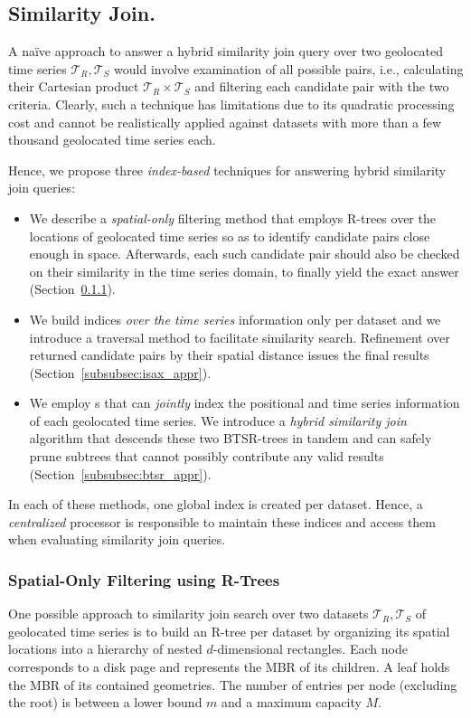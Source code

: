 \subsection{Similarity Join.} 
\label{subsec:sim_join}
A na\"ive approach to answer a hybrid similarity join query over two geolocated time series $\mathcal{T}_{R}, \mathcal{T}_{S}$ would involve examination of all possible pairs, i.e., calculating their Cartesian product $\mathcal{T}_{R} \times \mathcal{T}_{S}$ and filtering each candidate pair with the two criteria. Clearly, such a technique has limitations due to its quadratic processing cost and cannot be realistically applied against datasets with more than a few thousand geolocated time series each.  

Hence, we propose three {\em index-based} techniques for answering hybrid similarity join queries:

\begin{itemize}
\item We describe a {\em spatial-only} filtering method that employs R-trees over the locations of geolocated time series so as to identify candidate pairs close enough in space. Afterwards, each such candidate pair should also be checked on their similarity in the time series domain, to finally yield the exact answer (Section~\ref{subsubsec:rtree}). 
\item We build \isax indices {\em over the time series} information only per dataset and we introduce a traversal method to facilitate similarity search. Refinement over returned candidate pairs by their spatial distance issues the final results (Section~\ref{subsubsec:isax_appr}).
\item We employ {\btsr}s that can {\em jointly} index the positional and time series information of each geolocated time series.  We introduce a {\em hybrid similarity join} algorithm that descends these two BTSR-trees in tandem and can safely prune subtrees that cannot possibly contribute any valid results (Section~\ref{subsubsec:btsr_appr}).
\end{itemize}

In each of these methods, one global index is created per dataset. Hence, a {\em centralized} processor is responsible to maintain these indices and access them when evaluating similarity join queries.

\subsubsection{Spatial-Only Filtering using R-Trees}
\label{subsubsec:rtree}
One possible approach to similarity join search over two datasets $\mathcal{T}_{R}, \mathcal{T}_{S}$ of geolocated time series is to build an R-tree \cite{Guttman1984} per dataset by organizing its spatial locations into a hierarchy of nested $d$-dimensional rectangles. Each node corresponds to a disk page and represents the MBR of its children. A leaf holds the MBR of its contained geometries. The number of entries per node (excluding the root) is between a lower bound $m$ and a maximum capacity $M$.

